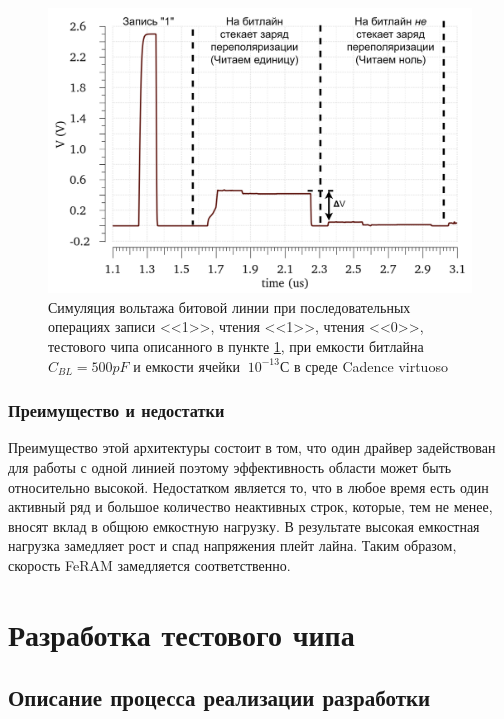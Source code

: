 \documentclass[a4paper,12pt]{article} %
\begin{document}
   \begin{figure}[H]
  \includegraphics[width=\textwidth]{FRAM-BL.png}
  \caption{Симуляция вольтажа битовой линии при последовательных операциях записи <<1>>, чтения <<1>>, чтения <<0>>, тестового чипа описанного в пункте \ref{sec:test_chip}, при емкости битлайна  $C_{BL}=500pF $ и емкости ячейки $~10^{-13} С $ в среде Cadence virtuoso }
  \label{pic:bl_read}
  \end{figure}



\subsubsection{Преимущество и недостатки}
Преимущество этой архитектуры состоит в том, что один драйвер задействован для работы с одной линией поэтому эффективность области может быть относительно   высокой. Недостатком является то, что в любое время есть один активный ряд и большое количество неактивных строк, которые, тем не менее, вносят вклад в общюю емкостную нагрузку. В результате высокая емкостная нагрузка замедляет рост и спад напряжения  плейт лайна. Таким образом, скорость FeRAM замедляется соответственно.












\section{Разработка тестового чипа}
\label{sec:test_chip}

\subsection{Описание процесса реализации разработки}
\end{document}
